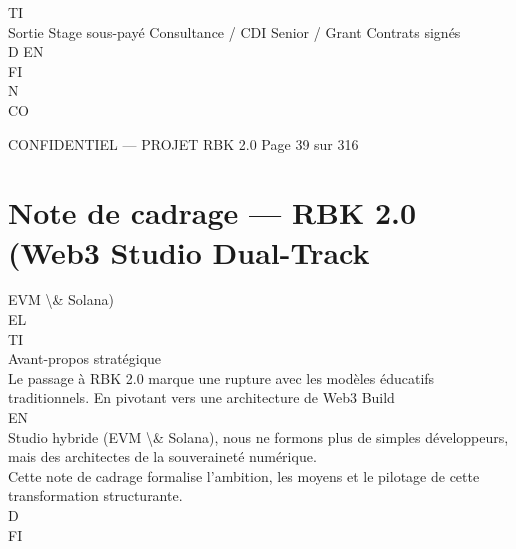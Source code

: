 \vspace{0.5em}
\vspace{0.5em}
\vspace{0.5em}
\vspace{0.5em}
TI\\
Sortie        Stage sous-payé                    Consultance / CDI Senior / Grant   Contrats signés\\
\vspace{0.5em}
\vspace{0.5em}
\vspace{0.5em}
\vspace{0.5em}
D   EN\\
FI\\
N\\
CO\\
\vspace{0.5em}
\vspace{0.5em}
\vspace{0.5em}
\vspace{0.5em}
\begin{confidential}CONFIDENTIEL — PROJET RBK 2.0                                  Page 39 sur 316\end{confidential}
\section{Note de cadrage — RBK 2.0 (Web3 Studio Dual-Track}
EVM \textbackslash{}& Solana)\\
\vspace{0.5em}
\vspace{0.5em}
\vspace{0.5em}
\vspace{0.5em}
EL\\
TI\\
Avant-propos stratégique\\
\vspace{0.5em}
Le passage à RBK 2.0 marque une rupture avec les modèles éducatifs traditionnels. En pivotant vers une architecture de Web3 Build\\
\vspace{0.5em}
\vspace{0.5em}
\vspace{0.5em}
\vspace{0.5em}
EN\\
Studio hybride (EVM \textbackslash{}& Solana), nous ne formons plus de simples développeurs, mais des architectes de la souveraineté numérique.\\
Cette note de cadrage formalise l’ambition, les moyens et le pilotage de cette transformation structurante.\\
\vspace{0.5em}
\vspace{0.5em}
\vspace{0.5em}
\vspace{0.5em}
D\\
FI\\
